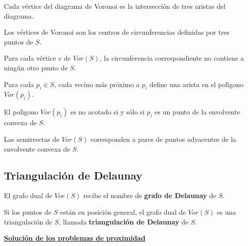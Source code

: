 \documentclass[twoside]{report}
\begin{document}
\begin{teorema} Cada v\'{e}rtice del diagrama de Voronoi es la intersecci\'{o}n de tres aristas del diagrama.
\end{teorema}

\begin{nota} Los v\'{e}rtices de Voronoi son los centros de
circunferencias definidas por tres puntos de $S$.
\end{nota}


\begin{teorema} Para cada v\'{e}rtice $v$ de $Vor(S)$, la
circunferencia correspondiente no contiene a ning\'{u}n otro punto de
$S$.
\end{teorema}

\begin{teorema} Para cada $p_i \in S$, cada vecino m\'{a}s
pr\'{o}ximo a $p_i$ define una arista en el pol\'{\i}gono $Vor(p_i)$.
\end{teorema}

\begin{teorema} El pol\'{\i}gono $Vor(p_i)$ es no acotado si y
s\'{o}lo si $p_i$ es un punto de la envolvente convexa de $S$.
\end{teorema}

\begin{coro} Las semirrectas de $Vor(S)$ corresponden a
pares de puntos adyacentes de la envolvente convexa de $S$.
\end{coro}

\subsection{Triangulaci\'on de Delaunay}

\begin{defi} El grafo dual de $Vor(S)$ recibe el nombre de \textbf{grafo de Delaunay} de $S$.
\end{defi}

\begin{teorema} Si los puntos de $S$ est\'an en posici\'on
ge\-ne\-ral, el grafo dual de $Vor(S)$ es una triangulaci\'on de
$S$, llamada \textbf{triangulaci\'on de Delaunay} de $S$.
\end{teorema}

\textbf{\underline{Soluci\'{o}n de los problemas de proximidad}}
\end{document}

